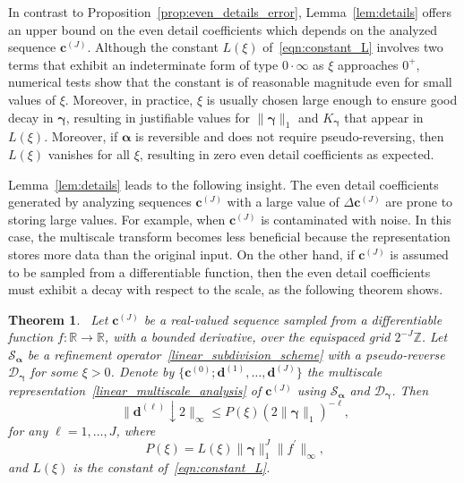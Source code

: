 \documentclass[12pt]{article}
\newtheorem{theorem}{Theorem}[section]
\begin{document}
In contrast to Proposition~\ref{prop:even_details_error}, Lemma~\ref{lem:details} offers an upper bound on the even detail coefficients which depends on the analyzed sequence $\boldsymbol{c}^{(J)}$. Although the constant $L(\xi)$ of~\eqref{eqn:constant_L} involves two terms that exhibit an indeterminate form of type $0\cdot\infty$ as $\xi$ approaches $0^+$, numerical tests show that the constant is of reasonable magnitude even for small values of $\xi$. Moreover, in practice, $\xi$ is usually chosen large enough to ensure good decay in $\boldsymbol{\gamma}$, resulting in justifiable values for $\|\boldsymbol{\gamma}\|_1$ and $K_{\boldsymbol{\gamma}}$ that appear in $L(\xi)$. Moreover, if $\boldsymbol{\alpha}$ is reversible and does not require pseudo-reversing, then $L(\xi)$ vanishes for all $\xi$, resulting in zero even detail coefficients as expected.

Lemma~\ref{lem:details} leads to the following insight. The even detail coefficients generated by analyzing sequences $\boldsymbol{c}^{(J)}$ with a large value of $\Delta\boldsymbol{c}^{(J)}$ are prone to storing large values. For example, when $\boldsymbol{c}^{(J)}$ is contaminated with noise. In this case, the multiscale transform becomes less beneficial because the representation stores more data than the original input. On the other hand, if $\boldsymbol{c}^{(J)}$ is assumed to be sampled from a differentiable function, then the even detail coefficients must exhibit a decay with respect to the scale, as the following theorem shows.

\begin{theorem}~\label{thm:details_difference}
    Let $\boldsymbol{c}^{(J)}$ be a real-valued sequence sampled from a differentiable function $f:\mathbb{R}\rightarrow\mathbb{R}$, with a bounded derivative, over the equispaced grid $2^{-J}\mathbb{Z}$. Let $\mathcal{S}_{\boldsymbol{\alpha}}$ be a refinement operator~\eqref{linear_subdivision_scheme} with a pseudo-reverse $\mathcal{D}_{\boldsymbol{\gamma}}$ for some $\xi>0$. Denote by $\{\boldsymbol{c}^{(0)};\boldsymbol{d}^{(1)},\dots,\boldsymbol{d}^{(J)}\}$ the multiscale representation~\eqref{linear_multiscale_analysis} of $\boldsymbol{c}^{(J)}$ using $\mathcal{S}_{\boldsymbol{\alpha}}$ and $ \mathcal{D}_{\boldsymbol{\gamma}}$. Then
    \begin{equation}~\label{differentiable_details_bound}
        \|\boldsymbol{d}^{(\ell)}\downarrow 2\|_\infty \leq P(\xi)(2\|\boldsymbol{\gamma}\|_1)^{-\ell},
    \end{equation}
    for any $\ell=1,\dots,J$, where 
    \begin{equation}~\label{eqn:constant_P}
        P(\xi) = L(\xi)\|\boldsymbol{\gamma}\|^J_1\|f^\prime\|_\infty,
    \end{equation}
    and $L(\xi)$ is the constant of~\eqref{eqn:constant_L}.
\end{theorem}
\end{document}
